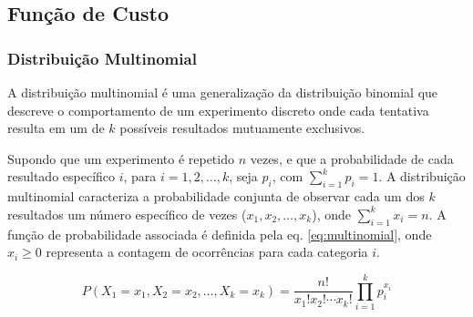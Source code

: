 





\subsection{Função de Custo}
\label{sec:modelo-loss}


\subsubsection{Distribuição Multinomial}
\label{sec:modelo-multi}

A distribuição multinomial \cite{distbook-multinomial} é uma generalização da distribuição binomial \cite{distbook-binomial} que descreve o comportamento de um experimento discreto onde cada tentativa resulta em um de $k$ possíveis resultados mutuamente exclusivos.

Supondo que um experimento é repetido $n$ vezes, e que a probabilidade de cada resultado específico $i$, para $i=1,2,\dots,k$, seja $p_i$, com $\sum_{i=1}^k p_i = 1$. A distribuição multinomial caracteriza a probabilidade conjunta de observar cada um dos $k$ resultados um número específico de vezes ($x_1, x_2,\dots, x_k$), onde $\sum_{i=1}^k x_i = n$. A função de probabilidade associada é definida pela eq. \eqref{eq:multinomial}, onde \( x_i \geq 0 \) representa a contagem de ocorrências para cada categoria \( i \).

\begin{equation}\label{eq:multinomial}
  P(X_1 = x_1, X_2 = x_2, \dots, X_k = x_k) = \frac{n!}{x_1! x_2! \cdots x_k!} \prod_{i=1}^k p_i^{x_i}
\end{equation}

